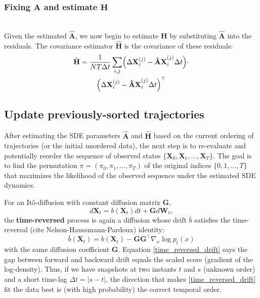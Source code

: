 \documentclass[conference]{IEEEtran}
\begin{document}
\subsubsection{Fixing $\mathbf{A}$ and estimate $\mathbf{H}$} \mbox{}\\
Given the estimated $\hat{\mathbf{A}}$, we now begin to estimate $\mathbf{H}$ by substituting $\hat{\mathbf{A}}$ into the residuals.
The covariance estimator $\hat{\mathbf{H}}$ is the covariance of these residuals:
\begin{multline}\label{H_MLE}
    \hat{\mathbf{H}} = \frac{1}{NT\Delta t}\sum_{i, j}\Bigl(\Delta\mathbf{X}_i^{(j)} - \mathbf{\hat{A}X}_i^{(j)}\Delta t\Bigr) \cdot \\
    \Bigl(\Delta\mathbf{X}_i^{(j)} - \mathbf{\hat{A}X}_i^{(j)}\Delta t\Bigr)^\top
\end{multline}

\subsection{Update previously-sorted trajectories}
After estimating the SDE parameters $\hat{\mathbf{A}}$ and $\hat{\mathbf{H}}$ based on the current ordering of trajectories
(or the initial unordered data), the next step is to re-evaluate and potentially reorder the sequence of observed states
$\{\mathbf{X}_0, \mathbf{X}_1, \ldots, \mathbf{X}_T\}$. The goal is to find the permutation $\pi = (\pi_0, \pi_1, \ldots, \pi_T)$
of the original indices $\{0, 1, \ldots, T\}$ that maximizes the likelihood of the observed sequence under the estimated SDE dynamics.

For an Itô-diffusion with constant diffusion matrix $\mathbf{G}$,
\[
    d\mathbf{X}_t = b(\mathbf{X}_t)dt + \mathbf{G} d\mathbf{W}_t,
\]
the \textbf{time-reversed} process is again a diffusion whose drift $\bar{b}$ satisfies the time-reversal (cite Nelson-Haussmann-Pardoux)
identity:
\begin{equation}\label{time_reversed_drift}
    \bar{b}(\mathbf{X}_t) = b(\mathbf{X}_t) - \mathbf{G}\mathbf{G}^\top \nabla_x\log p_t(x)
\end{equation}
with the same diffusion coefficient $\mathbf{G}$.
Equation \eqref{time_reversed_drift} says the gap between forward and backward drift equals the scaled score (gradient of the log-density).
Thus, if we have snapshots at two instants $t$ and $s$ (unknown order) and a short time-lag $\Delta t = |s - t|$, the direction that makes
\eqref{time_reversed_drift} fit the data best is (with high probability) the correct temporal order.
\end{document}
